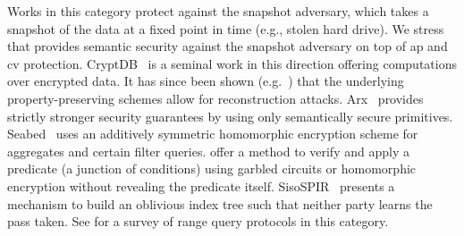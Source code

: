 			Works in this category protect against the snapshot adversary, which takes a snapshot of the data at a fixed point in time (e.g., stolen hard drive).
			We stress that \epsolute{} provides semantic security against the snapshot adversary on top of \acrshort{ap} and \acrshort{cv} protection.
			CryptDB~\cite{crypt-db} is a seminal work in this direction offering computations over encrypted data.
			It has since been shown (e.g.~\cite{inference-attacks-naveed-15,inference-attack-inference-attack-islam-14,attacks-tao-of-inference}) that the underlying property-preserving schemes allow for reconstruction attacks.
			Arx~\cite{arx} provides strictly stronger security guarantees by using only semantically secure primitives.
			Seabed~\cite{seabed} uses an additively symmetric homomorphic encryption scheme for aggregates and certain filter queries.
			\textcite{ppqed} offer a method to verify and apply a predicate (a junction of conditions) using garbled circuits or homomorphic encryption without revealing the predicate itself.
			SisoSPIR~\cite{sisospir} presents a mechanism to build an oblivious index tree such that neither party learns the pass taken.
			See \cite{ore-benchmark-17} for a survey of range query protocols in this category. %
